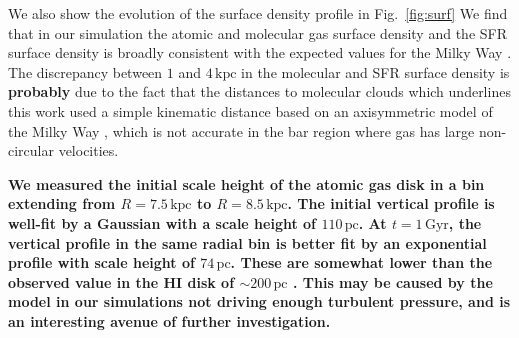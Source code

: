 \documentclass[twocolumn,linenumbers,trackchanges]{aastex631}
\begin{document}
We also show the evolution of the surface density profile in Fig.~\ref{fig:surf}
We find that in our simulation the atomic and molecular gas surface density and
the SFR surface density is broadly consistent with the expected values for the
Milky Way \citep{2008AA...487..951K,2022ApJ...929L..18E}. The discrepancy between
$1$ and $4\,\textrm{kpc}$ in the molecular and SFR surface density is {\bf probably} due
to the fact that the distances to molecular clouds which underlines this work
used a simple kinematic distance based on an axisymmetric model of the Milky
Way \citep{2017ApJ...834...57M}, which is not accurate in the bar region where gas
has large non-circular velocities.

{\bf We measured the initial scale height of the atomic gas disk in a bin
extending from $R=7.5\,\textrm{kpc}$ to $R=8.5\,\textrm{kpc}$. The initial
vertical profile is well-fit by a Gaussian with a scale height of
$110\,\textrm{pc}$. At $t=1\,\textrm{Gyr}$, the vertical profile in the same
radial bin is better fit by an exponential profile with scale height of
$74\,\textrm{pc}$. These are somewhat lower than the observed value in the HI
disk of $\sim200\,\textrm{pc}$ \citep{1995ApJ...448..138M, 2017AA...607A.106M}.
This may be caused by the model in our simulations not driving enough turbulent
pressure, and is an interesting avenue of further investigation.}
\end{document}
